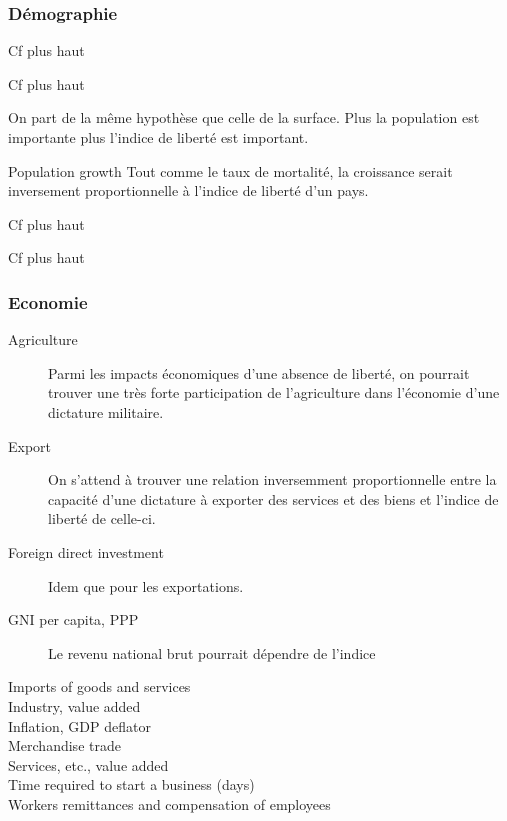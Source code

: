  
\subsubsection{Démographie} 
\begin{description}
\item [Fertility rate]
Cf plus haut
\item [Adolescent fertility]
Cf plus haut
\item [Population totale]
On part de la même hypothèse que celle de la surface. Plus la population est importante plus l'indice de liberté est important.
\item Population growth
Tout comme le taux de mortalité, la croissance serait inversement proportionnelle à l'indice de liberté d'un pays.
\item [Life expectancy]
Cf plus haut
\item [Surface]
Cf plus haut
\end{description}
 
\subsubsection{Economie}
\begin{description}
\item [Agriculture]
Parmi les impacts économiques d'une absence de liberté, on pourrait trouver une très forte participation de l'agriculture dans l'économie d'une dictature militaire.
\item [Export]
On s'attend à trouver une relation inversemment proportionnelle entre la capacité d'une dictature à exporter des services et des biens et l'indice de liberté de celle-ci.
\item [Foreign direct investment]
Idem que pour les exportations. 
\item [GNI per capita, PPP ]
Le revenu national brut pourrait dépendre de l'indice
\item [Imports of goods and services] 
\item [Industry, value added]
\item [Inflation, GDP deflator] 
\item [Merchandise trade]
\item [Services, etc., value added]
\item [Time required to start a business (days)]
\item [Workers remittances and compensation of employees]

\end{description}

